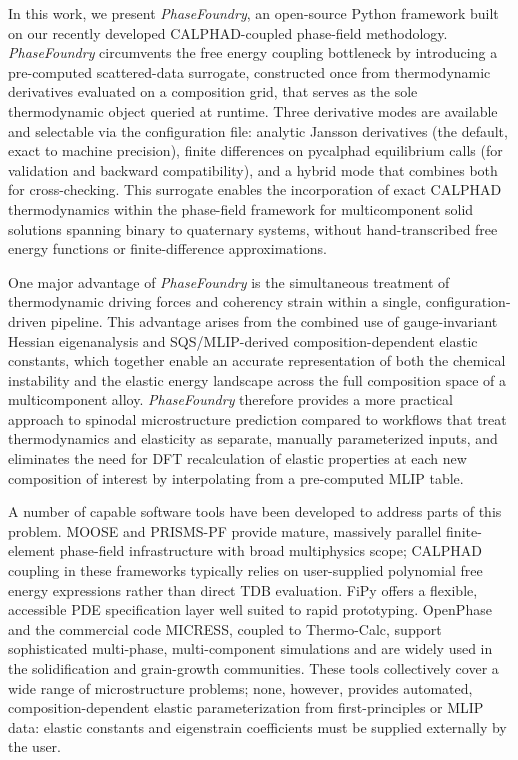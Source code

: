 \documentclass[12pt]{article}
\begin{document}
In this work, we present \textit{PhaseFoundry}, an open-source Python framework built on our recently developed CALPHAD-coupled phase-field methodology.\cite{attari2021strain,attari2023uncertainty,attari2020exploration,attari2023benchmarking,kunselman2025spinodal} \textit{PhaseFoundry} circumvents the free energy coupling bottleneck by introducing a pre-computed scattered-data surrogate, constructed once from thermodynamic derivatives evaluated on a composition grid, that serves as the sole thermodynamic object queried at runtime. Three derivative modes are available and selectable via the configuration file: analytic Jansson derivatives\cite{kunselman2024analytically} (the default, exact to machine precision), finite differences on pycalphad equilibrium calls (for validation and backward compatibility), and a hybrid mode that combines both for cross-checking. This surrogate enables the incorporation of exact CALPHAD thermodynamics within the phase-field framework for multicomponent solid solutions spanning binary to quaternary systems, without hand-transcribed free energy functions or finite-difference approximations.

One major advantage of \textit{PhaseFoundry} is the simultaneous treatment of thermodynamic driving forces and coherency strain within a single, configuration-driven pipeline. This advantage arises from the combined use of gauge-invariant Hessian eigenanalysis\cite{kadirvel2022exploration,morral2021stability} and SQS/MLIP-derived composition-dependent elastic constants,\cite{zunger1990special} which together enable an accurate representation of both the chemical instability and the elastic energy landscape across the full composition space of a multicomponent alloy. \textit{PhaseFoundry} therefore provides a more practical approach to spinodal microstructure prediction compared to workflows that treat thermodynamics and elasticity as separate, manually parameterized inputs,\cite{permann2020moose,dewitt2020prisms} and eliminates the need for DFT recalculation of elastic properties at each new composition of interest by interpolating from a pre-computed MLIP table.

A number of capable software tools have been developed to address parts of this problem. MOOSE\cite{permann2020moose} and PRISMS-PF\cite{dewitt2020prisms} provide mature, massively parallel finite-element phase-field infrastructure with broad multiphysics scope; CALPHAD coupling in these frameworks typically relies on user-supplied polynomial free energy expressions rather than direct TDB evaluation. FiPy\cite{guyer2009fipy} offers a flexible, accessible PDE specification layer well suited to rapid prototyping. OpenPhase and the commercial code MICRESS, coupled to Thermo-Calc, support sophisticated multi-phase, multi-component simulations and are widely used in the solidification and grain-growth communities. These tools collectively cover a wide range of microstructure problems; none, however, provides automated, composition-dependent elastic parameterization from first-principles or MLIP data: elastic constants and eigenstrain coefficients must be supplied externally by the user.
\end{document}
